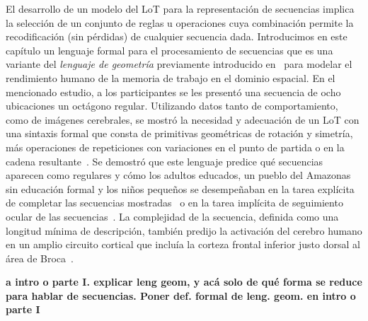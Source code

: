 El desarrollo de un modelo del LoT para la representación de secuencias implica la selección de un conjunto de reglas u operaciones cuya combinación permite la recodificación (sin pérdidas) de cualquier secuencia dada. Introducimos en este capítulo un lenguaje formal para el procesamiento de secuencias que es una variante del \textit{lenguaje de geometría} previamente introducido en~\cite{amalric2017language} para modelar el rendimiento humano de la memoria de trabajo en el dominio espacial. En el mencionado estudio, a los participantes se les presentó una secuencia de ocho ubicaciones un octágono regular. Utilizando datos tanto de comportamiento, como de imágenes cerebrales, se mostró la necesidad y adecuación de un LoT con una sintaxis formal que consta de primitivas geométricas de rotación y simetría, más operaciones de repeticiones con variaciones en el punto de partida o en la cadena resultante~\cite{romano2018bayesian,amalric2017language,f59,f60}. Se demostró que este lenguaje predice qué secuencias aparecen como regulares y cómo los adultos educados, un pueblo del Amazonas sin educación formal y los niños pequeños se desempeñaban en la tarea explícita de completar las secuencias mostradas~\cite{amalric2017language} o en la tarea implícita de seguimiento ocular de las secuencias~\cite{f60}. La complejidad de la secuencia, definida como una longitud mínima de descripción, también predijo la activación del cerebro humano en un amplio circuito cortical que incluía la corteza frontal inferior justo dorsal al área de Broca~\cite{f60}.


\color{blue}
{\bf a intro o parte I. explicar leng geom, y acá solo de qué forma se reduce para hablar de secuencias. Poner def. formal de leng. geom. en intro o parte I}

